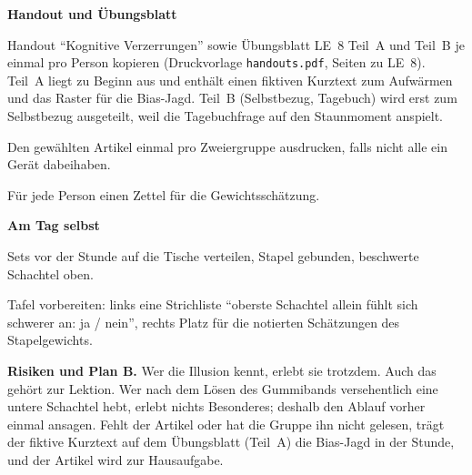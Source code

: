 \begin{vorbereitung}
\textbf{Handout und Übungsblatt}
\begin{checkliste}
  \item Handout \enquote{Kognitive Verzerrungen} sowie Übungsblatt LE~8
    Teil~A und Teil~B je einmal pro Person kopieren (Druckvorlage
    \texttt{handouts.pdf}, Seiten zu LE~8). Teil~A liegt zu Beginn aus
    und enthält einen fiktiven Kurztext zum Aufwärmen und das Raster für
    die Bias-Jagd. Teil~B (Selbstbezug, Tagebuch) wird erst zum
    Selbstbezug ausgeteilt, weil die Tagebuchfrage auf den Staunmoment
    anspielt.
  \item Den gewählten Artikel einmal pro Zweiergruppe ausdrucken, falls
    nicht alle ein Gerät dabeihaben.
  \item Für jede Person einen Zettel für die Gewichtsschätzung.
\end{checkliste}

\textbf{Am Tag selbst}
\begin{checkliste}
  \item Sets vor der Stunde auf die Tische verteilen, Stapel gebunden,
    beschwerte Schachtel oben.
  \item Tafel vorbereiten: links eine Strichliste \enquote{oberste
    Schachtel allein fühlt sich schwerer an: ja / nein}, rechts Platz für
    die notierten Schätzungen des Stapelgewichts.
\end{checkliste}

\textbf{Risiken und Plan B.} Wer die Illusion kennt, erlebt sie trotzdem.
Auch das gehört zur Lektion. Wer
nach dem Lösen des Gummibands versehentlich eine untere Schachtel hebt,
erlebt nichts Besonderes; deshalb den Ablauf vorher einmal ansagen. Fehlt
der Artikel oder hat die Gruppe ihn nicht gelesen, trägt der fiktive
Kurztext auf dem Übungsblatt (Teil~A) die Bias-Jagd in der Stunde, und der
Artikel wird zur Hausaufgabe.
\end{vorbereitung}

